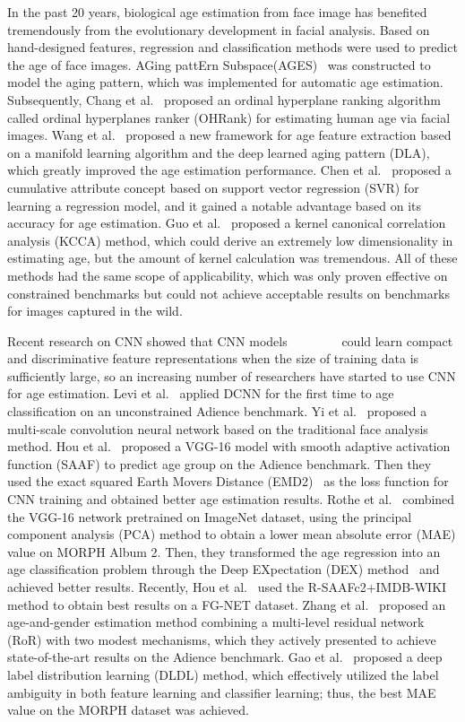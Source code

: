 \documentclass[journal]{IEEEtran}
\begin{document}
In the past 20 years, biological age estimation from face image has benefited tremendously from the evolutionary development in facial analysis. Based on hand-designed features, regression and classification methods were used to predict the age of face images. AGing pattErn Subspace(AGES)~\cite{ref-23} was constructed to model the aging pattern, which was implemented for automatic age estimation. Subsequently, Chang et al.~\cite{ref-24} proposed an ordinal hyperplane ranking algorithm called ordinal hyperplanes ranker (OHRank) for estimating human age via facial images. Wang et al.~\cite{ref-25} proposed a new framework for age feature extraction based on a manifold learning algorithm and the deep learned aging pattern (DLA), which greatly improved the age estimation performance. Chen et al.~\cite{ref-26} proposed a cumulative attribute concept based on support vector regression (SVR) for learning a regression model, and it gained a notable advantage based on its accuracy for age estimation.  Guo et al.~\cite{ref-28} proposed a kernel canonical correlation analysis (KCCA) method, which could derive an extremely low dimensionality in estimating age, but the amount of kernel calculation was tremendous. All of these methods had the same scope of applicability, which was only proven effective on constrained benchmarks but could not achieve acceptable results on benchmarks for images captured in the wild.
\par
Recent research on CNN showed that CNN models~\cite{ref-7}~\cite{ref-9}~\cite{ref-11}~\cite{ref-12}~\cite{ref-13}~\cite{ref-14}~\cite{ref-15}~\cite{ref-61} could learn compact and discriminative feature representations when the size of training data is sufficiently large, so an increasing number of researchers have started to use CNN for age estimation. Levi et al.~\cite{ref-16} applied DCNN for the first time to age classification on an unconstrained Adience benchmark. Yi et al.~\cite{ref-29} proposed a multi-scale convolution neural network based on the traditional face analysis method. Hou et al.~\cite{ref-17} proposed a VGG-16 model with smooth adaptive activation function (SAAF) to predict age group on the Adience benchmark. Then they used the exact squared Earth Movers Distance (EMD2)~\cite{ref-18} as the loss function for CNN training and obtained better age estimation results. Rothe et al.~\cite{ref-30} combined the VGG-16 network pretrained on ImageNet dataset, using the principal component analysis (PCA) method to obtain a lower mean absolute error (MAE) value on MORPH Album 2. Then, they transformed the age regression into an age classification problem through the Deep EXpectation (DEX) method~\cite{ref-19} and achieved better results. Recently, Hou et al.~\cite{ref-21} used the R-SAAFc2+IMDB-WIKI method to obtain best results on a FG-NET dataset. Zhang et al.~\cite{ref-22} proposed an age-and-gender estimation method combining a multi-level residual network (RoR) with two modest mechanisms, which they actively presented to achieve state-of-the-art results on the Adience benchmark. Gao et al.~\cite{ref-32} proposed a deep label distribution learning (DLDL) method, which effectively utilized the label ambiguity in both feature learning and classifier learning; thus, the best MAE value on the MORPH dataset was achieved.
\end{document}
